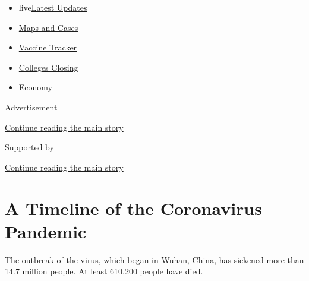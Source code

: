 \begin{itemize}
\tightlist
\item
  live\href{https://www.nytimes3xbfgragh.onion/2020/08/20/world/coronavirus-covid.html?name=styln-coronavirus-national\&region=TOP_BANNER\&variant=undefined\&block=storyline_menu_recirc\&action=click\&pgtype=Article\&impression_id=c8d29901-e382-11ea-9004-a3db723e3d7e}{Latest
  Updates}
\item
  \href{https://www.nytimes3xbfgragh.onion/interactive/2020/us/coronavirus-us-cases.html?name=styln-coronavirus-national\&region=TOP_BANNER\&variant=undefined\&block=storyline_menu_recirc\&action=click\&pgtype=Article\&impression_id=c8d29902-e382-11ea-9004-a3db723e3d7e}{Maps
  and Cases}
\item
  \href{https://www.nytimes3xbfgragh.onion/interactive/2020/science/coronavirus-vaccine-tracker.html?name=styln-coronavirus-national\&region=TOP_BANNER\&variant=undefined\&block=storyline_menu_recirc\&action=click\&pgtype=Article\&impression_id=c8d29903-e382-11ea-9004-a3db723e3d7e}{Vaccine
  Tracker}
\item
  \href{https://www.nytimes3xbfgragh.onion/2020/08/19/us/colleges-closing-covid.html?name=styln-coronavirus-national\&region=TOP_BANNER\&variant=undefined\&block=storyline_menu_recirc\&action=click\&pgtype=Article\&impression_id=c8d29904-e382-11ea-9004-a3db723e3d7e}{Colleges
  Closing}
\item
  \href{https://www.nytimes3xbfgragh.onion/live/2020/08/20/business/stock-market-today-coronavirus?name=styln-coronavirus-national\&region=TOP_BANNER\&variant=undefined\&block=storyline_menu_recirc\&action=click\&pgtype=Article\&impression_id=c8d29905-e382-11ea-9004-a3db723e3d7e}{Economy}
\end{itemize}

Advertisement

\protect\hyperlink{after-top}{Continue reading the main story}

Supported by

\protect\hyperlink{after-sponsor}{Continue reading the main story}

\hypertarget{a-timeline-of-the-coronavirus-pandemic}{%
\section{A Timeline of the Coronavirus
Pandemic}\label{a-timeline-of-the-coronavirus-pandemic}}

The outbreak of the virus, which began in Wuhan, China, has sickened
more than 14.7 million people. At least 610,200 people have died.

